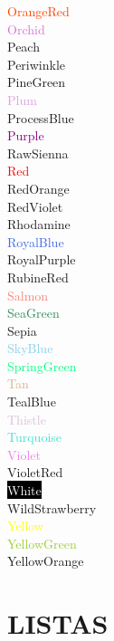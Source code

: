 \documentclass[12pt]{article}
\begin{document}
\textcolor{OrangeRed}{OrangeRed}\\
\textcolor{Orchid}{Orchid}\\
\textcolor{Peach}{Peach}\\
\textcolor{Periwinkle}{Periwinkle}\\
\textcolor{PineGreen}{PineGreen}\\
\textcolor{Plum}{Plum}\\
\textcolor{ProcessBlue}{ProcessBlue}\\
\textcolor{Purple}{Purple}\\
\textcolor{RawSienna}{RawSienna}\\
\textcolor{Red}{Red}\\
\textcolor{RedOrange}{RedOrange}\\
\textcolor{RedViolet}{RedViolet}\\
\textcolor{Rhodamine}{Rhodamine}\\
\textcolor{RoyalBlue}{RoyalBlue}\\
\textcolor{RoyalPurple}{RoyalPurple}\\
\textcolor{RubineRed}{RubineRed}\\
\textcolor{Salmon}{Salmon}\\
\textcolor{SeaGreen}{SeaGreen}\\
\textcolor{Sepia}{Sepia}\\
\textcolor{SkyBlue}{SkyBlue}\\
\textcolor{SpringGreen}{SpringGreen}\\
\textcolor{Tan}{Tan}\\
\textcolor{TealBlue}{TealBlue}\\
\textcolor{Thistle}{Thistle}\\
\textcolor{Turquoise}{Turquoise}\\
\textcolor{Violet}{Violet}\\
\textcolor{VioletRed}{}VioletRed\\
\colorbox{black}{\textcolor{White}{White}}\\
\textcolor{WildStrawberry}{WildStrawberry}\\
\textcolor{Yellow}{Yellow}\\
\textcolor{YellowGreen}{YellowGreen}\\
\textcolor{YellowOrange}{YellowOrange}\\


\newpage
\section{LISTAS}	
\end{document}
